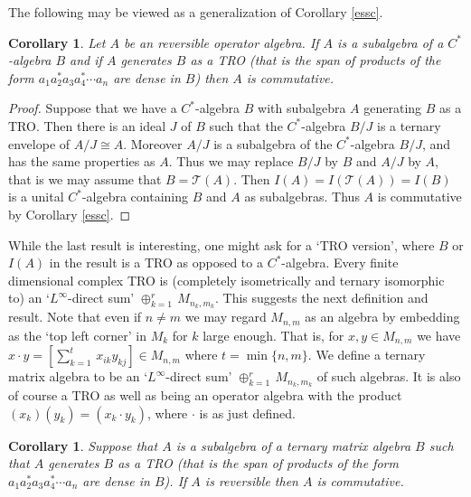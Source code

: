 \documentclass{amsart}
\newtheorem{corollary}[theorem]{Corollary}
\theoremstyle{remark}
\theoremstyle{definition}
\numberwithin{equation}{section}
\begin{document}
The following may be viewed as a generalization of Corollary \ref{essc}.

\begin{corollary}  \label{parti}  Let  $A$ be an reversible operator algebra.  If $A$ is a subalgebra of a $C^*$-algebra $B$ and if $A$ generates $B$ as a TRO 
(that is the span of products of the form $a_1 a_2^* a_3 a_4^* \cdots a_n$ are dense in $B$)
then $A$ is commutative.
 \end{corollary}

\begin{proof} Suppose that we have a  $C^*$-algebra $B$ with subalgebra $A$ generating $B$ as a TRO.  Then 
there is an ideal $J$ of $B$ such that the $C^*$-algebra $B/J$ is a ternary envelope of $A/J \cong A$.   Moreover 
$A/J$ is a subalgebra of the $C^*$-algebra  $B/J$, and has the same properties as $A$.   Thus we may replace
$B/J$ by $B$ and $A/J$ by $A$, that is we may assume that $B =  {\mathcal T}(A)$.   Then $I(A) = I({\mathcal T}(A)) = I(B)$ is a unital 
$C^*$-algebra  containing $B$ and $A$ as subalgebras.   Thus  $A$ is commutative by Corollary \ref{essc}.  
 \end{proof}
 
While the last result is interesting, one might ask for a `TRO version', where $B$ or $I(A)$ in the result is a TRO as 
opposed to a $C^*$-algebra.   
 Every  finite dimensional complex TRO is (completely isometrically 
and ternary isomorphic to) 
an `$L^\infty$-direct sum' $\oplus_{k = 1}^r \, M_{n_k,m_k}$.   This suggests the next definition and result.  Note that  even if $n \neq m$ we may 
regard $M_{n,m}$ as an algebra by embedding as the `top left corner' in $M_k$ for $k$ large enough. 
That is, for $x, y \in M_{n,m}$ we have $x \cdot y = [\sum_{k = 1}^t \, x_{ik} y_{kj}] \in M_{n,m}$ where $t = \min \{ n,m \}$.
We define a ternary matrix algebra to be an `$L^\infty$-direct sum' $\oplus_{k = 1}^r \, M_{n_k,m_k}$ of such algebras.   It is 
also of course a TRO as well as being an operator algebra with the product $(x_k) (y_k) = (x_k \cdot y_k)$, where $\cdot$ is as just defined. 

\begin{corollary}  \label{recta}  Suppose that $A$ is a subalgebra of a ternary  matrix algebra $B$ such that $A$ generates $B$ as a TRO
(that is the span of products of the form $a_1 a_2^* a_3 a_4^* \cdots a_n$ are dense in $B$).   
If $A$ is  
reversible  then 
 $A$ is commutative.
 \end{corollary} 
\end{document}
